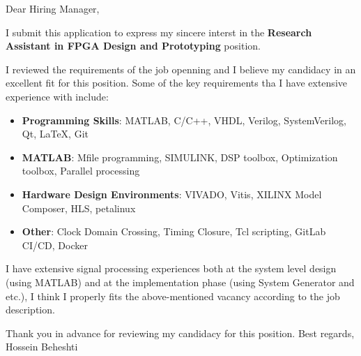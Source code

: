 \documentclass[localFont]{awesome-source-cv} %
\begin{document}
\makecvheader


\bigskip %
Dear Hiring Manager,

\bigskip 

I submit this application to express my sincere interst in the \textbf{Research Assistant in FPGA Design and Prototyping} position.

I reviewed the requirements of the job openning and I believe my candidacy in an excellent fit for this position. Some of the key requirements tha I have extensive experience with include:

\begin{itemize}
	\item \textbf{Programming Skills}:
	      MATLAB, C/C++, VHDL, Verilog, SystemVerilog, Qt, \LaTeX, Git
	\item \textbf{MATLAB}:
	      Mfile programming, SIMULINK, DSP toolbox, Optimization toolbox, Parallel processing
	\item \textbf{Hardware Design Environments}:
	      VIVADO, Vitis, XILINX Model Composer, HLS, petalinux
	\item \textbf{Other}:
	      Clock Domain Crossing, Timing Closure, Tcl scripting, GitLab CI/CD, Docker
\end{itemize}

I have extensive signal processing experiences both at the system level design (using MATLAB) and at the implementation phase (using System Generator and etc.), I think I properly fits the above-mentioned vacancy according to the job description.


Thank you in advance for reviewing my candidacy for this position.
\bigskip 
Best regards,
\vspace{50pt}
Hossein Beheshti 
\end{document}
